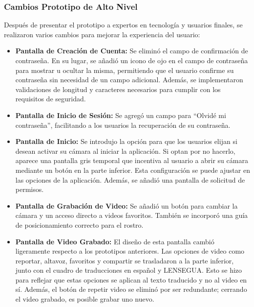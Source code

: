 \subsubsection{Cambios Prototipo de Alto Nivel}

Después de presentar el prototipo a expertos en tecnología y usuarios finales, se realizaron varios cambios para mejorar la experiencia del usuario:

\begin{itemize}
    \item \textbf{Pantalla de Creación de Cuenta:} Se eliminó el campo de confirmación de contraseña. En su lugar, se añadió un icono de ojo en el campo de contraseña para mostrar u ocultar la misma, permitiendo que el usuario confirme su contraseña sin necesidad de un campo adicional. Además, se implementaron validaciones de longitud y caracteres necesarios para cumplir con los requisitos de seguridad.
    
    \item \textbf{Pantalla de Inicio de Sesión:} Se agregó un campo para ``Olvidé mi contraseña'', facilitando a los usuarios la recuperación de su contraseña.
    
    \item \textbf{Pantalla de Inicio:} Se introdujo la opción para que los usuarios elijan si desean activar su cámara al iniciar la aplicación. Si optan por no hacerlo, aparece una pantalla gris temporal que incentiva al usuario a abrir su cámara mediante un botón en la parte inferior. Esta configuración se puede ajustar en las opciones de la aplicación. Además, se añadió una pantalla de solicitud de permisos.
    
    \item \textbf{Pantalla de Grabación de Video:} Se añadió un botón para cambiar la cámara y un acceso directo a videos favoritos. También se incorporó una guía de posicionamiento correcto para el rostro.
    
    \item \textbf{Pantalla de Video Grabado:} El diseño de esta pantalla cambió ligeramente respecto a los prototipos anteriores. Las opciones de video como reportar, altavoz, favoritos y compartir se trasladaron a la parte inferior, junto con el cuadro de traducciones en español y LENSEGUA. Esto se hizo para reflejar que estas opciones se aplican al texto traducido y no al video en sí. Además, el botón de repetir video se eliminó por ser redundante; cerrando el video grabado, es posible grabar uno nuevo.
    

\end{itemize}
